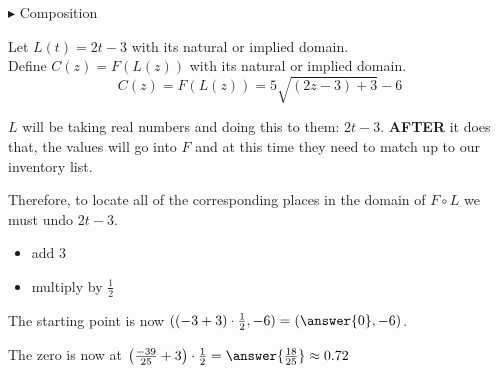 \documentclass{ximera}
\begin{document}
\begin{example}
$\blacktriangleright$ Composition


Let $L(t) = 2t - 3$ with its natural or implied domain. \\


Define $C(z) = F(L(z))$ with its natural or implied domain. \\

\[
C(z) = F(L(z)) = 5 \sqrt{(2z - 3) + 3} - 6 
\]



$L$ will be taking real numbers and doing this to them: $2t - 3$.  \textbf{AFTER} it does that, the values will go into $F$ and at this time they need to match up to our inventory list.

Therefore, to locate all of the corresponding places in the domain of $F \circ L$ we must undo $2t - 3$.

\begin{itemize}
\item add $3$
\item multiply by $\frac{1}{2}$
\end{itemize}

The starting point is now $((-3 + 3)\cdot \frac{1}{2}, -6) = \left( \answer{0}, -6 \right)$.

The zero is now at $\left( \frac{-39}{25} + 3 \right) \cdot \frac{1}{2} = \answer{\frac{18}{25}} \approx 0.72$








\begin{image}
\end{image}
\end{example}
\end{document}
